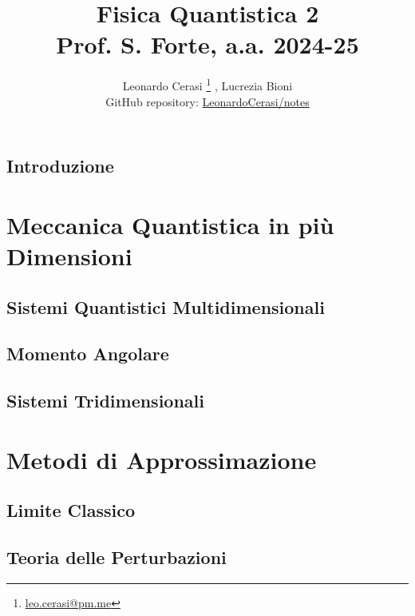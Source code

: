 \documentclass[a4paper, 12pt, openany]{book}
\author{Leonardo Cerasi%
	\thanks{\scriptsize\href{mailto:leonardo.cerasi@studenti.unimi.it}{leo.cerasi@pm.me}}%
	, Lucrezia Bioni\\
	\small GitHub repository: \href{https://github.com/LeonardoCerasi/notes}{LeonardoCerasi/notes}}
\title{\Huge\textbf{Fisica Quantistica 2} \\ \large Prof. S. Forte, a.a. 2024-25}
\begin{document}
\frontmatter

\maketitle

\tableofcontents
\pagestyle{indice}

\mainmatter

\chapter*{Introduzione}
\pagestyle{introd}


\part{Meccanica Quantistica in più Dimensioni}
\pagestyle{body}

\chapter{Sistemi Quantistici Multidimensionali}


\chapter{Momento Angolare}


\chapter{Sistemi Tridimensionali}


\part{Metodi di Approssimazione}
\pagestyle{body}

\chapter{Limite Classico}


\chapter{Teoria delle Perturbazioni}

\end{document}
